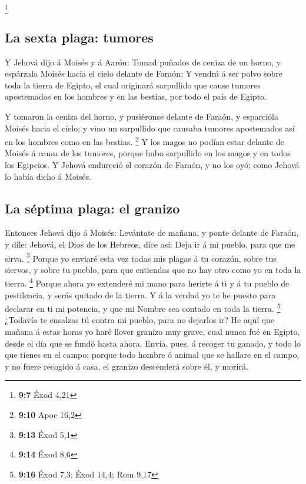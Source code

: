 \footnote{\textbf{9:7} Éxod 4,21}

\hypertarget{la-sexta-plaga-tumores}{%
\subsection{La sexta plaga: tumores}\label{la-sexta-plaga-tumores}}

 Y Jehová dijo á Moisés y á Aarón: Tomad puñados de ceniza
de un horno, y espárzala Moisés hacia el cielo delante de Faraón:
 Y vendrá á ser polvo sobre toda la tierra de Egipto, el
cual originará sarpullido que cause tumores apostemados en los hombres y
en las bestias, por todo el país de Egipto.

 Y tomaron la ceniza del horno, y pusiéronse delante de
Faraón, y esparcióla Moisés hacia el cielo; y vino un sarpullido que
causaba tumores apostemados así en los hombres como en las bestias.
\footnote{\textbf{9:10} Apoc 16,2}  Y los magos no podían
estar delante de Moisés á causa de los tumores, porque hubo sarpullido
en los magos y en todos los Egipcios.  Y Jehová endureció
el corazón de Faraón, y no los oyó; como Jehová lo había dicho á Moisés.

\hypertarget{la-suxe9ptima-plaga-el-granizo}{%
\subsection{La séptima plaga: el
granizo}\label{la-suxe9ptima-plaga-el-granizo}}

 Entonces Jehová dijo á Moisés: Levántate de mañana, y
ponte delante de Faraón, y dile: Jehová, el Dios de los Hebreos, dice
así: Deja ir á mi pueblo, para que me sirva. \footnote{\textbf{9:13}
  Éxod 5,1}  Porque yo enviaré esta vez todas mis plagas á
tu corazón, sobre tus siervos, y sobre tu pueblo, para que entiendas que
no hay otro como yo en toda la tierra. \footnote{\textbf{9:14} Éxod 8,6}
 Porque ahora yo extenderé mi mano para herirte á ti y á tu
pueblo de pestilencia, y serás quitado de la tierra.  Y á
la verdad yo te he puesto para declarar en ti mi potencia, y que mi
Nombre sea contado en toda la tierra. \footnote{\textbf{9:16} Éxod 7,3;
  Éxod 14,4; Rom 9,17}  ¿Todavía te ensalzas tú contra mi
pueblo, para no dejarlos ir?  He aquí que mañana á estas
horas yo haré llover granizo muy grave, cual nunca fué en Egipto, desde
el día que se fundó hasta ahora.  Envía, pues, á recoger tu
ganado, y todo lo que tienes en el campo; porque todo hombre ó animal
que se hallare en el campo, y no fuere recogido á casa, el granizo
descenderá sobre él, y morirá.

